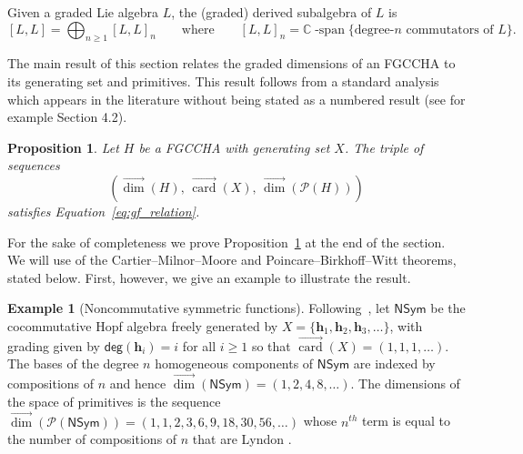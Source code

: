 \documentclass[11pt]{amsart}
\newtheorem{proposition}[theorem]{Proposition}
\theoremstyle{definition}
\newtheorem{example}[theorem]{Example}
\numberwithin{equation}{section}
\def\CC{{\mathbb C}}
\newcommand{\FGCCHA}{\textsf{FGCCHA}\xspace}
\newcommand{\vecdim}{\overrightarrow{\dim}}
\newcommand{\veccard}{\overrightarrow{\operatorname{card}}}
\begin{document}
Given a graded Lie algebra $L$, the (graded) derived subalgebra of $L$ is 
\begin{equation}
\label{eq:derivedLiesubalgebra}
[L, L] = \bigoplus_{n \ge 1} [L, L]_{n}
\qquad\text{where}\qquad
[L, L]_{n} = \CC\operatorname{-span}\{\text{degree-$n$ commutators of $L$}\}.
\end{equation}

The main result of this section relates the graded dimensions of an \FGCCHA to its generating set and primitives.
This result follows from a standard analysis which appears in the literature without being stated
as a numbered result (see for example \cite{AL15} Section 4.2).

\begin{proposition}
\label{prop:SequencesAsHopfStructures}
Let $H$ be a \FGCCHA with generating set $X$.  The triple of sequences
\[
\left(\vecdim(H), \,
\veccard(X),\,
\vecdim\left(\mathcal{P}(H)\right) \right)
\]
satisfies Equation~\eqref{eq:gf_relation}.
\end{proposition}


For the sake of completeness we prove Proposition~\ref{prop:SequencesAsHopfStructures} at the end of the section.  
We will use of the Cartier--Milnor--Moore and Poincare--Birkhoff--Witt theorems, stated below.  
First, however,  we give an example to illustrate the result.  

\begin{example}[Noncommutative symmetric functions]
\label{ex:NSym}
Following~\cite{GKLLRT}, let $\mathsf{NSym}$ be the cocommutative Hopf algebra freely generated by $X = \{ \mathbf{h}_1, \mathbf{h}_2, \mathbf{h}_3, \ldots \}$, with grading given by $\mathsf{deg}(\mathbf{h}_{i}) = i$ for all $i \ge 1$ so that $\veccard(X) = (1, 1, 1, \ldots)$.  
The bases of the degree $n$ homogeneous components of $\mathsf{NSym}$ are indexed by compositions
of $n$ and hence $\vecdim(\mathsf{NSym}) = (1,2,4,8,\ldots)$.
The dimensions of the space of primitives is the sequence 
$\vecdim(\mathcal{P}(\mathsf{NSym})) = (1, 1, 2, 3, 6, 9, 18, 30, 56, \ldots)$
whose $n^{th}$ term is equal to the number
of compositions of $n$ that are Lyndon \cite{H07}.
\end{example}

\end{document}
